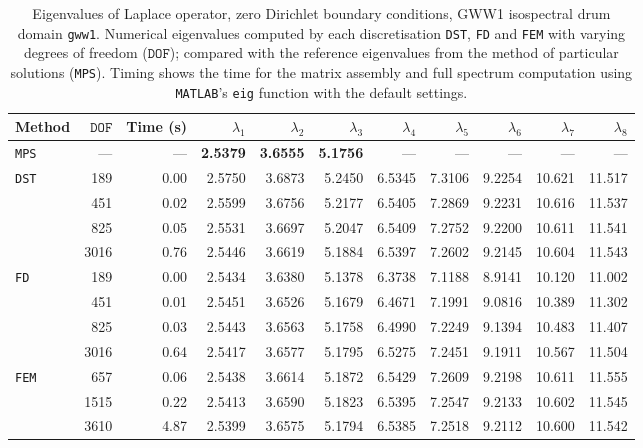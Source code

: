 %

\begin{table}[htbp]
  \centering
  {\scriptsize
  \begin{tabular}{lrrrrrrrrrr}
    \toprule
    Method & $\mathtt{DOF}$ & Time (s) & $\lambda_{1}$ & $\lambda_{2}$ & $\lambda_{3}$ & $\lambda_{4}$ & $\lambda_{5}$ & $\lambda_{6}$ & $\lambda_{7}$ & $\lambda_{8}$ \\
    \midrule
    \texttt{MPS} & --- & --- & \textbf{2.5379} & \textbf{3.6555} & \textbf{5.1756} & --- & --- & --- & --- & --- \\
    \midrule
    \multirow{4}{*}{\texttt{DST}} & 189 & 0.00 & 2.5750 & 3.6873 & 5.2450 & 6.5345 & 7.3106 & 9.2254 & 10.621 & 11.517 \\
     & 451 & 0.02 & 2.5599 & 3.6756 & 5.2177 & 6.5405 & 7.2869 & 9.2231 & 10.616 & 11.537 \\
     & 825 & 0.05 & 2.5531 & 3.6697 & 5.2047 & 6.5409 & 7.2752 & 9.2200 & 10.611 & 11.541 \\
     & 3016 & 0.76 & 2.5446 & 3.6619 & 5.1884 & 6.5397 & 7.2602 & 9.2145 & 10.604 & 11.543 \\
    \midrule
    \multirow{4}{*}{\texttt{FD}} & 189 & 0.00 & 2.5434 & 3.6380 & 5.1378 & 6.3738 & 7.1188 & 8.9141 & 10.120 & 11.002 \\
     & 451 & 0.01 & 2.5451 & 3.6526 & 5.1679 & 6.4671 & 7.1991 & 9.0816 & 10.389 & 11.302 \\
     & 825 & 0.03 & 2.5443 & 3.6563 & 5.1758 & 6.4990 & 7.2249 & 9.1394 & 10.483 & 11.407 \\
     & 3016 & 0.64 & 2.5417 & 3.6577 & 5.1795 & 6.5275 & 7.2451 & 9.1911 & 10.567 & 11.504 \\
    \midrule
    \multirow{3}{*}{\texttt{FEM}} & 657 & 0.06 & 2.5438 & 3.6614 & 5.1872 & 6.5429 & 7.2609 & 9.2198 & 10.611 & 11.555 \\
     & 1515 & 0.22 & 2.5413 & 3.6590 & 5.1823 & 6.5395 & 7.2547 & 9.2133 & 10.602 & 11.545 \\
     & 3610 & 4.87 & 2.5399 & 3.6575 & 5.1794 & 6.5385 & 7.2518 & 9.2112 & 10.600 & 11.542 \\
    \bottomrule
  \end{tabular}}
  \caption{Eigenvalues of Laplace operator, zero Dirichlet boundary conditions, GWW1 isospectral drum domain \texttt{gww1}. Numerical eigenvalues computed by each discretisation \texttt{DST}, \texttt{FD} and \texttt{FEM} with varying degrees of freedom ($\mathtt{DOF}$); compared with the reference eigenvalues from the method of particular solutions (\texttt{MPS}). Timing shows the time for the matrix assembly and full spectrum computation using \texttt{MATLAB}'s \lstinline{eig} function with the default settings.}
  \label{tab:eigenvalues_head_gww1}
\end{table}
